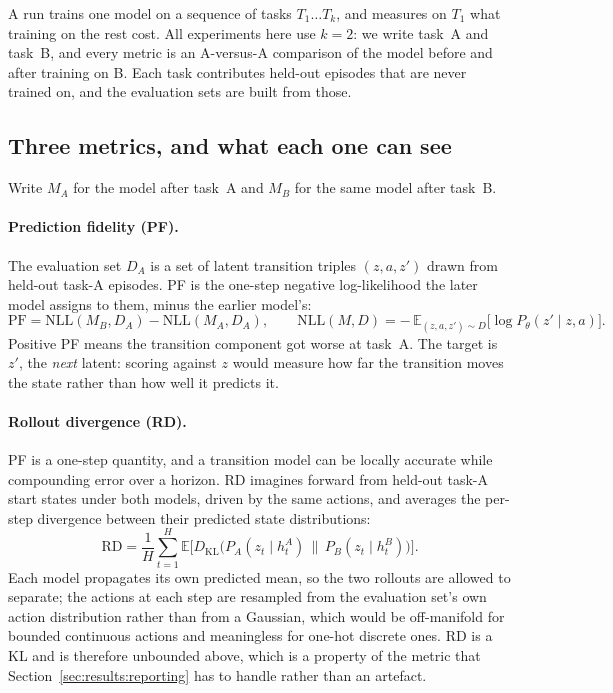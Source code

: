 A run trains one model on a sequence of tasks $T_1 \ldots T_k$, and measures on
$T_1$ what training on the rest cost. All experiments here use $k = 2$: we write
task~A and task~B, and every metric is an A-versus-A comparison of the model
before and after training on B. Each task contributes held-out episodes that are
never trained on, and the evaluation sets are built from those.

\subsection{Three metrics, and what each one can see}
\label{sec:method:metrics}

Write $M_A$ for the model after task~A and $M_B$ for the same model after task~B.

\paragraph{Prediction fidelity (PF).} The evaluation set $D_A$ is a set of
latent transition triples $(z, a, z')$ drawn from held-out task-A episodes. PF
is the one-step negative log-likelihood the later model assigns to them, minus
the earlier model's:
%
\begin{equation}
  \mathrm{PF} = \mathrm{NLL}(M_B, D_A) - \mathrm{NLL}(M_A, D_A),
  \qquad
  \mathrm{NLL}(M, D) = -\,\mathbb{E}_{(z,a,z') \sim D}
  \big[\log P_\theta(z' \mid z, a)\big].
  \label{eq:pf}
\end{equation}
%
Positive PF means the transition component got worse at task~A. The target is
$z'$, the \emph{next} latent: scoring against $z$ would measure how far the
transition moves the state rather than how well it predicts it.

\paragraph{Rollout divergence (RD).} PF is a one-step quantity, and a
transition model can be locally accurate while compounding error over a horizon.
RD imagines forward from held-out task-A start states under both models, driven
by the same actions, and averages the per-step divergence between their
predicted state distributions:
%
\begin{equation}
  \mathrm{RD} = \frac{1}{H} \sum_{t=1}^{H}
  \mathbb{E}\Big[
  D_{\mathrm{KL}}\big(P_{A}(z_t \mid h^A_{t}) \,\big\|\,
  P_{B}(z_t \mid h^B_{t})\big)\Big].
  \label{eq:rd}
\end{equation}
%
Each model propagates its own predicted mean, so the two rollouts are allowed to
separate; the actions at each step are resampled from the evaluation set's own
action distribution rather than from a Gaussian, which would be off-manifold for
bounded continuous actions and meaningless for one-hot discrete ones. RD is a KL
and is therefore unbounded above, which is a property of the metric that
Section~\ref{sec:results:reporting} has to handle rather than an artefact.

